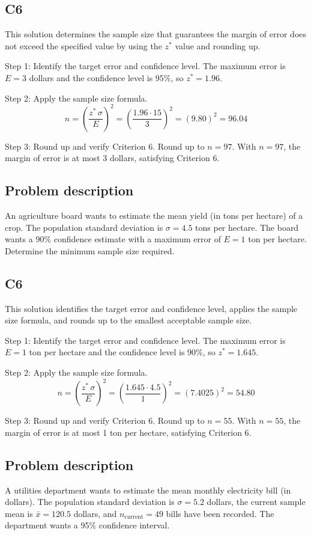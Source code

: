 \begin{ExamProblems}
		\subsection*{C6}
		This solution determines the sample size that guarantees the margin of error does not exceed the specified value by using the $z^*$ value and rounding up.
		
		Step 1: Identify the target error and confidence level. The maximum error is $E = 3$ dollars and the confidence level is 95\%, so $z^* = 1.96$.
		
		Step 2: Apply the sample size formula.
		\[
		n = \left(\frac{z^*\,\sigma}{E}\right)^2
		= \left(\frac{1.96 \cdot 15}{3}\right)^2
		= \left(9.80\right)^2
		= 96.04
		\]
		
		Step 3: Round up and verify Criterion 6. Round up to $n = 97$. With $n=97$, the margin of error is at most 3 dollars, satisfying Criterion 6.
		
		\item
		\subsection*{Problem description}
		An agriculture board wants to estimate the mean yield (in tons per hectare) of a crop. The population standard deviation is $\sigma = 4.5$ tons per hectare. The board wants a 90\% confidence estimate with a maximum error of $E = 1$ ton per hectare. Determine the minimum sample size required.
		
		\subsection*{C6}
		This solution identifies the target error and confidence level, applies the sample size formula, and rounds up to the smallest acceptable sample size.
		
		Step 1: Identify the target error and confidence level. The maximum error is $E = 1$ ton per hectare and the confidence level is 90\%, so $z^* = 1.645$.
		
		Step 2: Apply the sample size formula.
		\[
		n = \left(\frac{z^*\,\sigma}{E}\right)^2
		= \left(\frac{1.645 \cdot 4.5}{1}\right)^2
		= \left(7.4025\right)^2
		= 54.80
		\]
		
		Step 3: Round up and verify Criterion 6. Round up to $n = 55$. With $n=55$, the margin of error is at most 1 ton per hectare, satisfying Criterion 6.
		
		\item
		\subsection*{Problem description}
		A utilities department wants to estimate the mean monthly electricity bill (in dollars). The population standard deviation is $\sigma = 5.2$ dollars, the current sample mean is $\bar{x} = 120.5$ dollars, and $n_{\text{current}} = 49$ bills have been recorded. The department wants a 95\% confidence interval.
		

\end{ExamProblems}
